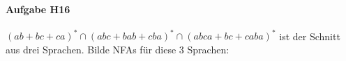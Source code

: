 \documentclass[11pt]{article}
\begin{document}


%
%
\paragraph{Aufgabe H16}
$(ab+bc+ca)^* \cap (abc+bab+cba)^* \cap (abca+bc+caba)^*$ ist der Schnitt aus drei Sprachen. Bilde NFAs für diese 3 Sprachen:
\end{document}
